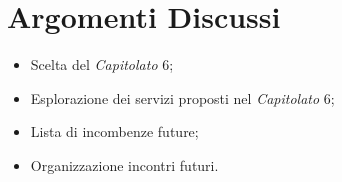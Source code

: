 \section{Argomenti Discussi}
	\begin{itemize}
		\item Scelta del \textit{Capitolato\glo} 6;
		\item Esplorazione dei servizi proposti nel \textit{Capitolato\glo} 6;
        \item Lista di incombenze future;
		\item Organizzazione incontri futuri.
	\end{itemize}
